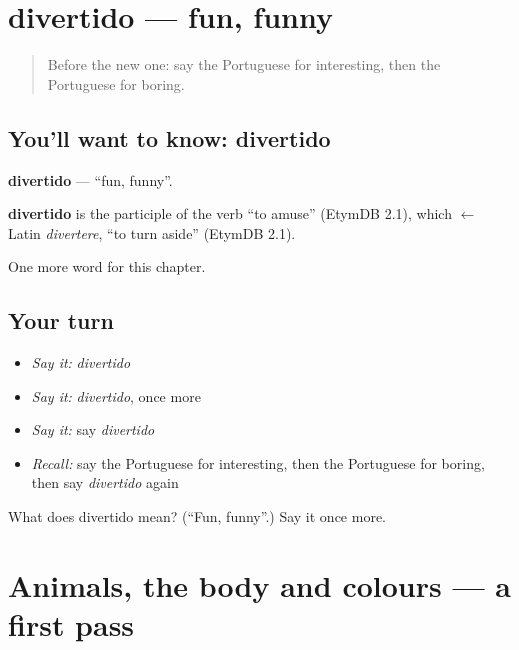 \section[divertido]{divertido — fun, funny}

\label{lesson:PT-C123-divertido}



\begin{quote}
Before the new one: say the Portuguese for interesting, then the Portuguese for boring.
\end{quote}

\subsection*{You'll want to know: divertido}
\textbf{divertido} — \textquotedblleft{}fun, funny\textquotedblright{}.

\begin{cousinweb}
\textbf{divertido} is the participle of the verb \textquotedblleft{}to amuse\textquotedblright{} (EtymDB 2.1), which $\leftarrow$ Latin \emph{divertere}, \textquotedblleft{}to turn aside\textquotedblright{} (EtymDB 2.1).
\end{cousinweb}

\begin{grammarlens}[title={What you've built}]
One more word for this chapter.
\end{grammarlens}

\subsection*{Your turn}
\begin{itemize}
\raggedright
  \item \emph{Say it:} \emph{divertido}
  \item \emph{Say it:} \emph{divertido}, once more
  \item \emph{Say it:} say \emph{divertido}
  \item \emph{Recall:} say the Portuguese for interesting, then the Portuguese for boring, then say \emph{divertido} again
\end{itemize}

\begin{tcolorbox}[breakable,colback=teal!4,colframe=teal!35!black,title={Before you move on}]
What does divertido mean? (\textquotedblleft{}Fun, funny\textquotedblright{}.) Say it once more.
\end{tcolorbox}
\section[(dialogue)]{Animals, the body and colours — a first pass}

